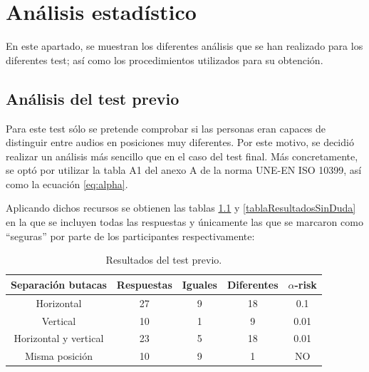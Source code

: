 \documentclass[11pt,a4paper,twoside]{book}
\author{Víctor de Tejada Molera}
\begin{document}
\chapter{Análisis estadístico}    
    
    En este apartado, se muestran los diferentes análisis que se han realizado para los diferentes test; así como los procedimientos utilizados para su obtención.
        
    \section{Análisis del test previo}
        Para este test sólo se pretende comprobar si las personas eran capaces de distinguir entre audios en posiciones muy diferentes. Por este motivo, se decidió realizar un análisis más sencillo que en el caso del test final. Más concretamente, se optó por utilizar la tabla A1 del anexo A de la norma UNE-EN ISO 10399, así como la ecuación \ref{eq:alpha}.
            
        Aplicando dichos recursos se obtienen las tablas \ref{tablaResultadosDuda} y \ref{tablaResultadosSinDuda} en la que se incluyen todas las respuestas y únicamente las que se marcaron como ``seguras'' por parte de los participantes respectivamente:
            
        \begin{table}
	    \begin{center}
		\begin{scriptsize}
		\begin{tabular}{| c | c | c | c || c |}
			\hline
			\textbf{Separación butacas}&\textbf{Respuestas}&\textbf{Iguales}&\textbf{Diferentes}&\textbf{$\alpha$-risk}\\ \hline
            Horizontal&27&9&18&0.1\\ \hline
            Vertical&10&1&9&0.01\\ \hline
            Horizontal y vertical&23
            &5&18&0.01\\ \hline
            Misma posición&10&9&1&NO\\ \hline
		\end{tabular}
		\caption{Resultados del test previo.}
		\label{tablaResultadosDuda}
		\end{scriptsize}
		\end{center}	
		\end{table}	
		
\end{document}
